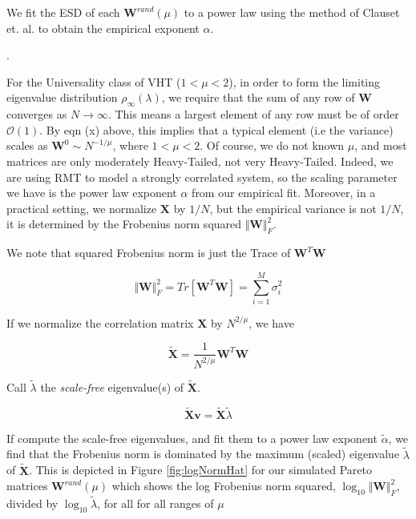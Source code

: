 We fit the ESD of each $\mathbf{W}^{rand}(\mu)$ to a power law using the method of Clauset et. al. to obtain the empirical exponent $\alpha$.  

.

For the Universality class of VHT ($1<\mu<2$), in order to form the limiting eigenvalue distribution $\rho_{\infty}(\lambda)$,
we require that the sum of any row of $\mathbf{W}$ converges as $N\rightarrow\infty$. This means a largest  element of any row
must be of order $\mathcal{O}(1)$.  By eqn (x) above, this implies that a typical element  (i.e the variance) scales as $\mathbf{W}^{0}\sim N^{-1/\mu}$, where $1<\mu<2$.
Of course, we do not known $\mu$, and most matrices are only moderately Heavy-Tailed, not very Heavy-Tailed.
Indeed, we are using RMT to model a strongly correlated system, so the scaling parameter
we have is the power law exponent $\alpha$ from our empirical fit.
Moreover, in a practical setting, we normalize $\mathbf{X}$ by $1/N$, but the empirical variance is not $1/N$, it is determined by the Frobenius norm squared
$\Vert\mathbf{W}\Vert^{2}_{F}$.   

We note that squared Frobenius norm is just the Trace of $\mathbf{W}^{T}\mathbf{W}$

$$\Vert\mathbf{W}\Vert_{F}^{2}=Tr[\mathbf{W}^{T}\mathbf{W}]=\sum_{i=1}^{M}\sigma^{2}_{i}$$

If we normalize the correlation matrix $\mathbf{X}$ by $N^{2/\mu}$, we have

$$\tilde{\mathbf{X}}=\dfrac{1}{N^{2/\mu}}\mathbf{W}^{T}\mathbf{W}$$

Call $\tilde{\lambda}$ the \emph{scale-free} eigenvalue(s) of $\tilde{\mathbf{X}}$.

$$\tilde{\mathbf{X}}\mathbf{v}=\tilde{\mathbf{X}}\tilde{\lambda}$$

If compute the scale-free eigenvalues, and fit them to a power law exponent $\tilde{\alpha}$, we find that the Frobenius norm is dominated by the maximum (scaled) eigenvalue $\tilde{\lambda}$ of $\tilde{\mathbf{X}}$.  
This is depicted in Figure 
  \ref{fig:logNormHat}
for our simulated Pareto matrices  $\mathbf{W}^{rand}(\mu)$ which shows
the log Frobenius norm squared, $\log_{10}\Vert\mathbf{W}\Vert^{2}_{F}$, divided by $\log_{10}\tilde{\lambda}$,
for all for all ranges of $\mu$

